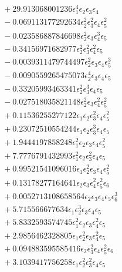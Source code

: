 \documentclass[10pt]{article}
\begin{document}
\begin{align*}
&{}  + 29.913068001236 \epsilon_{1}^{4} \epsilon_{2} \epsilon_{3} \epsilon_{4} \\
&{}  - 0.069113177292634 \epsilon_{2}^{2} \epsilon_{3}^{2} \epsilon_{4} \epsilon_{5}^{2} \\
&{}  - 0.023586887846698 \epsilon_{2}^{2} \epsilon_{3} \epsilon_{4}^{3} \epsilon_{5} \\
&{}  - 0.34156971682977 \epsilon_{2}^{2} \epsilon_{3}^{2} \epsilon_{4}^{2} \epsilon_{5} \\
&{}  - 0.0039311479744497 \epsilon_{2}^{2} \epsilon_{3} \epsilon_{4} \epsilon_{5}^{3} \\
&{}  - 0.0090559265475073 \epsilon_{2}^{4} \epsilon_{3} \epsilon_{4} \epsilon_{5} \\
&{}  - 0.33205993463341 \epsilon_{2}^{2} \epsilon_{3}^{3} \epsilon_{4} \epsilon_{5} \\
&{}  - 0.027518035821148 \epsilon_{2}^{2} \epsilon_{3} \epsilon_{4}^{2} \epsilon_{5}^{2} \\
&{}  + 0.11536255277122 \epsilon_{1} \epsilon_{2} \epsilon_{3}^{2} \epsilon_{4} \epsilon_{5}^{2} \\
&{}  + 0.23072510554244 \epsilon_{1} \epsilon_{2} \epsilon_{3}^{3} \epsilon_{4} \epsilon_{5} \\
&{}  + 1.9444197858248 \epsilon_{1}^{2} \epsilon_{2} \epsilon_{3} \epsilon_{4} \epsilon_{5}^{2} \\
&{}  + 7.7776791432993 \epsilon_{1}^{2} \epsilon_{2} \epsilon_{3}^{2} \epsilon_{4} \epsilon_{5} \\
&{}  + 0.99521541096016 \epsilon_{1} \epsilon_{2}^{2} \epsilon_{3} \epsilon_{4} \epsilon_{5}^{2} \\
&{}  + 0.13178277164641 \epsilon_{2} \epsilon_{3} \epsilon_{4}^{2} \epsilon_{5}^{2} \epsilon_{6} \\
&{}  + 0.0052713108658564 \epsilon_{2} \epsilon_{3} \epsilon_{4} \epsilon_{5} \epsilon_{6}^{3} \\
&{}  + 5.715566677634 \epsilon_{1} \epsilon_{2}^{3} \epsilon_{3} \epsilon_{4} \epsilon_{5} \\
&{}  + 5.8332593574745 \epsilon_{1}^{2} \epsilon_{2} \epsilon_{3} \epsilon_{4}^{2} \epsilon_{5} \\
&{}  + 2.9856462328805 \epsilon_{1} \epsilon_{2}^{2} \epsilon_{3} \epsilon_{4}^{2} \epsilon_{5} \\
&{}  + 0.094883595585416 \epsilon_{2} \epsilon_{3}^{2} \epsilon_{4} \epsilon_{5}^{2} \epsilon_{6} \\
&{}  + 3.1039417756258 \epsilon_{1} \epsilon_{2}^{2} \epsilon_{3}^{2} \epsilon_{4} \epsilon_{5} \\

\end{align*}
\end{document}
